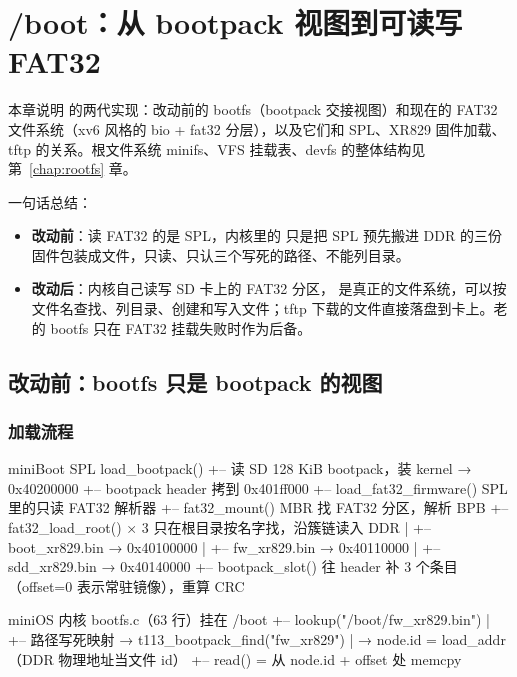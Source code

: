 \chapter{/boot：从 bootpack 视图到可读写 FAT32}
\label{chap:bootfat32}

本章说明  的两代实现：改动前的 bootfs（bootpack 交接视图）和现在的 FAT32 文件系统（xv6 风格的 bio + fat32 分层），以及它们和 SPL、XR829 固件加载、tftp 的关系。根文件系统 minifs、VFS 挂载表、devfs 的整体结构见第~\ref{chap:rootfs} 章。

一句话总结：

\begin{itemize}
  \item \textbf{改动前}：读 FAT32 的是 SPL，内核里的  只是把 SPL 预先搬进 DDR 的三份固件包装成文件，只读、只认三个写死的路径、不能列目录。
  \item \textbf{改动后}：内核自己读写 SD 卡上的 FAT32 分区， 是真正的文件系统，可以按文件名查找、列目录、创建和写入文件；tftp 下载的文件直接落盘到卡上。老的 bootfs 只在 FAT32 挂载失败时作为后备。
\end{itemize}

\section{改动前：bootfs 只是 bootpack 的视图}

\subsection{加载流程}

\begin{txtcode}[basicstyle=\ttfamily\scriptsize]
miniBoot SPL  load_bootpack()
+-- 读 SD 128 KiB bootpack，装 kernel → 0x40200000
+-- bootpack header 拷到 0x401ff000
+-- load_fat32_firmware()                 SPL 里的只读 FAT32 解析器
    +-- fat32_mount()                     MBR 找 FAT32 分区，解析 BPB
    +-- fat32_load_root() × 3             只在根目录按名字找，沿簇链读入 DDR
    |   +-- boot_xr829.bin → 0x40100000
    |   +-- fw_xr829.bin   → 0x40110000
    |   +-- sdd_xr829.bin  → 0x40140000
    +-- bootpack_slot()                   往 header 补 3 个条目（offset=0 表示常驻镜像），重算 CRC

miniOS 内核  bootfs.c（63 行）挂在 /boot
+-- lookup("/boot/fw_xr829.bin")
|   +-- 路径写死映射 → t113_bootpack_find("fw_xr829")
|       → node.id = load_addr（DDR 物理地址当文件 id）
+-- read() = 从 node.id + offset 处 memcpy
\end{txtcode}

